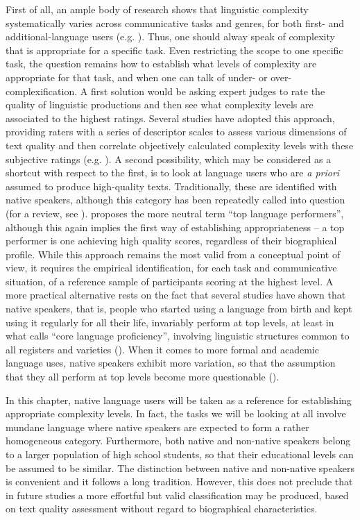 \documentclass[output=paper]{langscibook}
\begin{document}
First of all, an ample body of research shows that linguistic complexity systematically varies across communicative tasks and genres, for both first- and additional-language users (e.g. \citealt{FosterTavakoli2009, Ellis2011, Michel2011, MichelEtAl2019, Pallotti2019, LarssonKaatari2020}). Thus, one should alway speak of complexity that is appropriate for a specific task. Even restricting the scope to one specific task, the question remains how to establish what levels of complexity are appropriate for that task, and when one can talk of under- or over-complexification. A first solution would be asking expert judges to rate the quality of linguistic productions and then see what complexity levels are associated to the highest ratings. Several studies have adopted this approach, providing raters with a series of descriptor scales to assess various dimensions of text quality and then correlate objectively calculated complexity levels with these subjective ratings (e.g. \citealt{LahuertaMartínez2018, BiJiang2020}). A second possibility, which may be considered as a shortcut with respect to the first, is to look at language users who are \textit{a priori} assumed to produce high-quality texts. Traditionally, these are identified with native speakers, although this category has been repeatedly called into question (for a review, see \citealt{DewaeleEtAl2021}). \citet{Pallotti2019} proposes the more neutral term “top language performers”, although this again implies the first way of establishing appropriateness -- a top performer is one achieving high quality scores, regardless of their biographical profile. While this approach remains the most valid from a conceptual point of view, it requires the empirical identification, for each task and communicative situation, of a reference sample of participants scoring at the highest level. A more practical alternative rests on the fact that several studies have shown that native speakers, that is, people who started using a language from birth and kept using it regularly for all their life, invariably perform at top levels, at least in what \citet{Hulstijn2015} calls “core language proficiency”, involving linguistic structures common to all registers and varieties (\citealt{GranenaLong2013, Dąbrowska2019}). When it comes to more formal and academic language uses, native speakers exhibit more variation, so that the assumption that they all perform at top levels become more questionable (\citealt{Andringa2014, Hulstijn2015,Hulstijn2019, Dąbrowska2019}).

In this chapter, native language users will be taken as a reference for establishing appropriate complexity levels. In fact, the tasks we will be looking at all involve mundane language where native speakers are expected to form a rather homogeneous category. Furthermore, both native and non-native speakers belong to a larger population of high school students, so that their educational levels can be assumed to be similar. The distinction between native and non-native speakers is convenient and it follows a long tradition. However, this does not preclude that in future studies a more effortful but valid classification may be produced, based on text quality assessment without regard to biographical characteristics.
\end{document}
